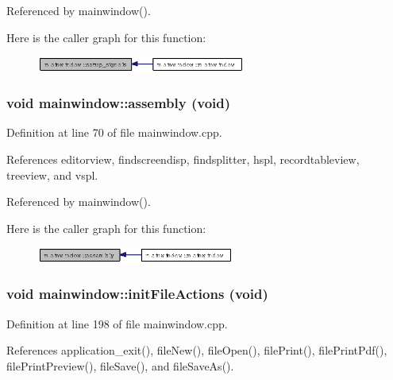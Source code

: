 Referenced by mainwindow().

Here is the caller graph for this function:\begin{figure}[H]
\begin{center}
\leavevmode
\includegraphics[width=194pt]{classmainwindow_9e1c0ddaa70c6851ea20983c36adb52b_icgraph}
\end{center}
\end{figure}
\subsubsection{\setlength{\rightskip}{0pt plus 5cm}void mainwindow::assembly (void)\hspace{0.3cm}{\tt  [private]}}\label{classmainwindow_f166528e596f9615d5ecd3a8d545ef9b}




Definition at line 70 of file mainwindow.cpp.

References editorview, findscreendisp, findsplitter, hspl, recordtableview, treeview, and vspl.

Referenced by mainwindow().

Here is the caller graph for this function:\begin{figure}[H]
\begin{center}
\leavevmode
\includegraphics[width=184pt]{classmainwindow_f166528e596f9615d5ecd3a8d545ef9b_icgraph}
\end{center}
\end{figure}
\subsubsection{\setlength{\rightskip}{0pt plus 5cm}void mainwindow::init\-File\-Actions (void)\hspace{0.3cm}{\tt  [private]}}\label{classmainwindow_c2cf8262152cac2a283474c3f42a22ac}




Definition at line 198 of file mainwindow.cpp.

References application\_\-exit(), file\-New(), file\-Open(), file\-Print(), file\-Print\-Pdf(), file\-Print\-Preview(), file\-Save(), and file\-Save\-As().


